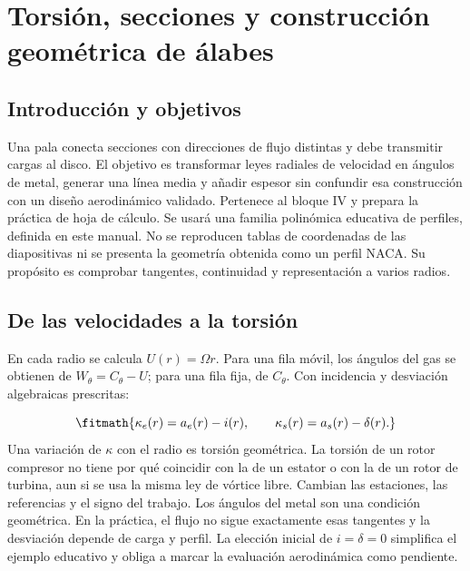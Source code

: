 \documentclass[10pt,openany]{book}
\begin{document}
\studiumchaptercheck

\chapter{Torsión, secciones y construcción geométrica de álabes}
\label{chap:c12}


\section{Introducción y objetivos}

Una pala conecta secciones con direcciones de flujo distintas y debe transmitir cargas al disco. El objetivo es transformar leyes radiales de velocidad en ángulos de metal, generar una línea media y añadir espesor sin confundir esa construcción con un diseño aerodinámico validado. Pertenece al bloque IV y prepara la práctica de hoja de cálculo.
Se usará una familia polinómica educativa de perfiles, definida en este manual. No se reproducen tablas de coordenadas de las diapositivas ni se presenta la geometría obtenida como un perfil NACA. Su propósito es comprobar tangentes, continuidad y representación a varios radios.

\section{De las velocidades a la torsión}

En cada radio se calcula \(U(r)=\Omega r\). Para una fila móvil, los ángulos del gas se obtienen de \(W_\theta=C_\theta-U\); para una fila fija, de \(C_\theta\). Con incidencia y desviación algebraicas prescritas:

\[
\fitmath{\kappa_e(r)=a_e(r)-i(r),\qquad \kappa_s(r)=a_s(r)-\delta(r).}
\]
Una variación de \(\kappa\) con el radio es torsión geométrica. La torsión de un rotor compresor no tiene por qué coincidir con la de un estator o con la de un rotor de turbina, aun si se usa la misma ley de vórtice libre. Cambian las estaciones, las referencias y el signo del trabajo.
Los ángulos del metal son una condición geométrica. En la práctica, el flujo no sigue exactamente esas tangentes y la desviación depende de carga y perfil. La elección inicial de \(i=\delta=0\) simplifica el ejemplo educativo y obliga a marcar la evaluación aerodinámica como pendiente.
\end{document}

